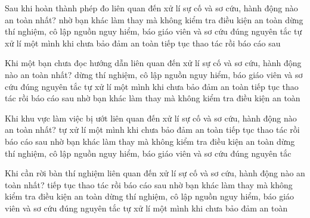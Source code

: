 \begin{ex}
Sau khi hoàn thành phép đo liên quan đến xử lí sự cố và sơ cứu, hành động nào an toàn nhất?
\choice
{nhờ bạn khác làm thay mà không kiểm tra điều kiện an toàn}
{\True dừng thí nghiệm, cô lập nguồn nguy hiểm, báo giáo viên và sơ cứu đúng nguyên tắc}
{tự xử lí một mình khi chưa bảo đảm an toàn}
{tiếp tục thao tác rồi báo cáo sau}
\end{ex}

\begin{ex}
Khi một bạn chưa đọc hướng dẫn liên quan đến xử lí sự cố và sơ cứu, hành động nào an toàn nhất?
\choice
{\True dừng thí nghiệm, cô lập nguồn nguy hiểm, báo giáo viên và sơ cứu đúng nguyên tắc}
{tự xử lí một mình khi chưa bảo đảm an toàn}
{tiếp tục thao tác rồi báo cáo sau}
{nhờ bạn khác làm thay mà không kiểm tra điều kiện an toàn}
\end{ex}

\begin{ex}
Khi khu vực làm việc bị ướt liên quan đến xử lí sự cố và sơ cứu, hành động nào an toàn nhất?
\choice
{tự xử lí một mình khi chưa bảo đảm an toàn}
{tiếp tục thao tác rồi báo cáo sau}
{nhờ bạn khác làm thay mà không kiểm tra điều kiện an toàn}
{\True dừng thí nghiệm, cô lập nguồn nguy hiểm, báo giáo viên và sơ cứu đúng nguyên tắc}
\end{ex}

\begin{ex}
Khi cần rời bàn thí nghiệm liên quan đến xử lí sự cố và sơ cứu, hành động nào an toàn nhất?
\choice
{tiếp tục thao tác rồi báo cáo sau}
{nhờ bạn khác làm thay mà không kiểm tra điều kiện an toàn}
{\True dừng thí nghiệm, cô lập nguồn nguy hiểm, báo giáo viên và sơ cứu đúng nguyên tắc}
{tự xử lí một mình khi chưa bảo đảm an toàn}
\end{ex}

